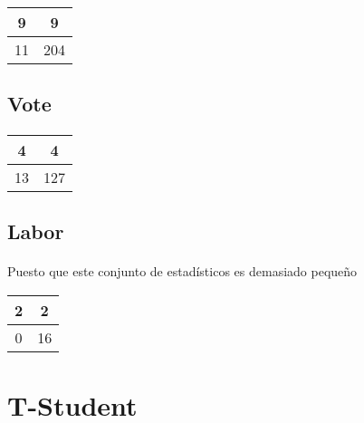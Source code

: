 \documentclass[10pt, a4paper,spanish]{article}
\begin{document}
			\paragraph{}

			\center
			\begin{tabular}{ | c | c | }
				\hline
				9 & 9 \\ \hline
				11 & 204 \\
				\hline
			\end{tabular}


		\subsection{Vote}

			\paragraph{}

			\begin{tabular}{ | c | c | }
				\hline
				4 & 4 \\ \hline
				13 & 127 \\
				\hline
			\end{tabular}

		\subsection{Labor}

			\paragraph{}
			Puesto que este conjunto de estadísticos es demasiado pequeño

			\begin{tabular}{ | c | c | }
				\hline
				2 & 2 \\ \hline
				0 & 16 \\
				\hline
			\end{tabular}

	\section{T-Student}

        \paragraph{}
\end{document}
